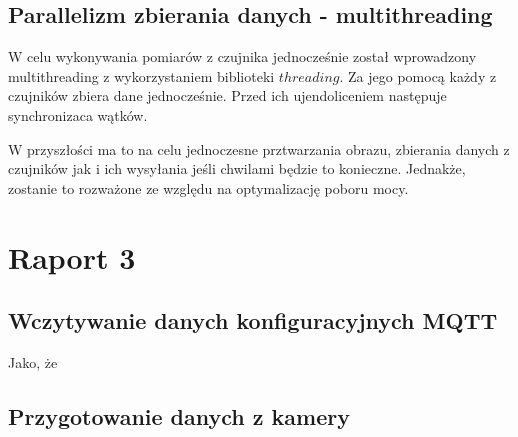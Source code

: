 \documentclass[runningheads]{llncs}
\begin{document}
\subsection{Parallelizm zbierania danych - multithreading}
W celu wykonywania pomiarów z czujnika jednocześnie został wprowadzony multithreading z wykorzystaniem biblioteki $threading$. Za jego pomocą każdy z czujników zbiera dane jednocześnie. Przed ich ujendoliceniem następuje synchronizaca wątków.

W przyszłości ma to na celu jednoczesne prztwarzania obrazu, zbierania danych z czujników jak i ich wysyłania jeśli chwilami będzie to konieczne. Jednakże, zostanie to rozważone ze względu na optymalizację poboru mocy.
\newpage
\section{Raport 3}
\subsection{Wczytywanie danych konfiguracyjnych MQTT}
Jako, że 
\subsection{Przygotowanie danych z kamery}
\end{document}
